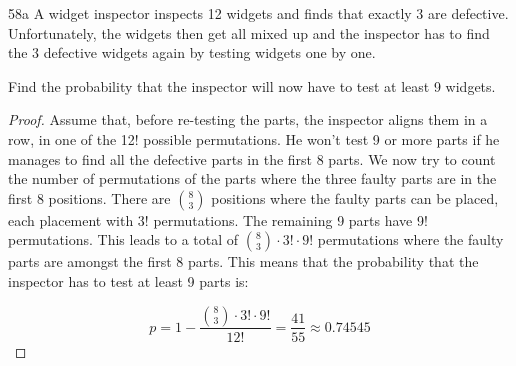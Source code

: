 \begin{exercise}{58a}
    A widget inspector inspects 12 widgets and finds that exactly 3 are defective. Unfortunately, the widgets then get all mixed up and the inspector has to find the 3 defective widgets again by testing widgets one by one.

    Find the probability that the inspector will now have to test at least 9 widgets.
\end{exercise}

\begin{proof}
    Assume that, before re-testing the parts, the inspector aligns them in a row, in one of the 12! possible permutations. He won't test 9 or more parts if he manages to find all the defective parts in the first 8 parts. We now try to count the number of permutations of the parts where the three faulty parts are in the first 8 positions. There are $8 \choose 3$ positions where the faulty parts can be placed, each placement with 3! permutations. The remaining 9 parts have 9! permutations. This leads to a total of ${8 \choose 3} \cdot 3! \cdot 9!$ permutations where the faulty parts are amongst the first 8 parts.
    This means that the probability that the inspector has to test at least 9 parts is:

    $$p = 1 - \frac{{8 \choose 3} \cdot 3! \cdot 9!}{12!} = \frac{41}{55} \approx 0.74545$$
\end{proof}


